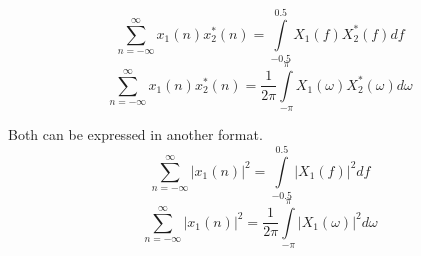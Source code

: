 \begin{equation}\label{eq:FourierTransformProperties-ParsevalsTheorem-Frequency}
  \sum\limits_{n=-\infty}^{\infty} x_{1}(n) x_{2}^{*}(n) = \int\limits_{-0.5}^{0.5} X_{1}(f) X_{2}^{*}(f) df
\end{equation}
\begin{equation}\label{eq:FourierTransformProperties-ParsevalsTheorem-Omega}
  \sum\limits_{n=-\infty}^{\infty} x_{1}(n) x_{2}^{*}(n) = \frac{1}{2 \pi} \int\limits_{-\pi}^{\pi} X_{1}(\omega) X_{2}^{*}(\omega) d\omega
\end{equation}

Both  can be expressed in another format.
\begin{equation}\label{eq:FourierTransformProperties-ParsevalsTheorem-Frequency-Absolute}
  \sum\limits_{n=-\infty}^{\infty} \lvert x_{1}(n) \rvert^{2} = \int\limits_{-0.5}^{0.5} \lvert X_{1}(f) \rvert^{2} df
\end{equation}
\begin{equation}\label{eq:FourierTransformProperties-ParsevalsTheorem-Omega-Absolute}
  \sum\limits_{n=-\infty}^{\infty} \lvert x_{1}(n) \rvert^{2} = \frac{1}{2 \pi} \int\limits_{-\pi}^{\pi} \lvert X_{1}(\omega) \rvert^{2} d\omega
\end{equation}
